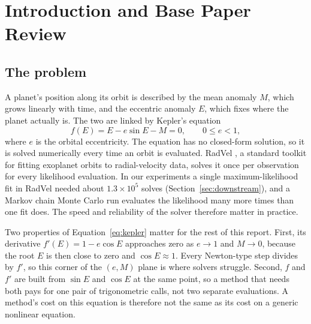 \documentclass[sigconf,nonacm]{acmart}
\begin{document}

\maketitle

\section{Introduction and Base Paper Review}

\subsection{The problem}

A planet's position along its orbit is described by the mean anomaly $M$,
which grows linearly with time, and the eccentric anomaly $E$, which fixes
where the planet actually is. The two are linked by Kepler's equation
\begin{equation}
f(E) = E - e\sin E - M = 0, \qquad 0 \le e < 1,
\label{eq:kepler}
\end{equation}
where $e$ is the orbital eccentricity. The equation has no closed-form
solution, so it is solved numerically every time an orbit is evaluated.
RadVel \cite{radvel}, a standard toolkit for fitting exoplanet orbits to
radial-velocity data, solves it once per observation for every
likelihood evaluation. In our experiments a single maximum-likelihood fit in RadVel needed
about $1.3\times10^{5}$ solves (Section~\ref{sec:downstream}), and a
Markov chain Monte Carlo run evaluates the likelihood many more times
than one fit does. The speed and reliability of
the solver therefore matter in practice.

Two properties of Equation~\eqref{eq:kepler} matter for the rest of this
report.
First, its derivative $f'(E) = 1 - e\cos E$ approaches zero as $e \to 1$
and $M \to 0$, because the root $E$ is then close to zero and
$\cos E \approx 1$. Every Newton-type step divides by $f'$, so this
corner of the $(e, M)$ plane is where solvers struggle. Second, $f$ and
$f'$ are built from $\sin E$ and $\cos E$ at the same point, so a method
that needs both pays for one pair of trigonometric calls, not two separate
evaluations. A method's cost on this equation is therefore not the same as
its cost on a generic nonlinear equation.
\end{document}
